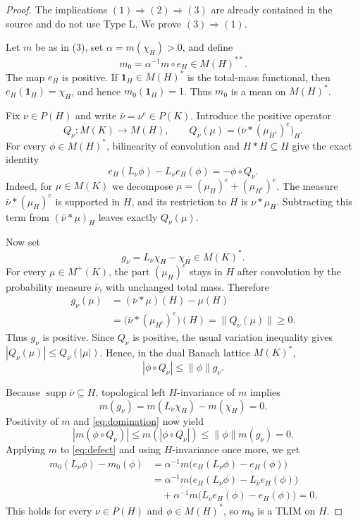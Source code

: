 \documentclass[11pt]{article}
\newcommand{\supp}{\operatorname{supp}}
\begin{document}
\begin{proof}
The implications $(1)\Rightarrow(2)\Rightarrow(3)$ are already contained in
the source and do not use Type L.  We prove $(3)\Rightarrow(1)$.

Let $m$ be as in (3), set $\alpha=m(\chi_H)>0$, and define
\[
  m_0=\alpha^{-1}m\circ e_H\in M(H)^{**}.
\]
The map $e_H$ is positive.  If $\mathbf 1_H\in M(H)^*$ is the total-mass
functional, then $e_H(\mathbf 1_H)=\chi_H$, and hence
$m_0(\mathbf 1_H)=1$.  Thus $m_0$ is a mean on $M(H)^*$.

Fix $\nu\in P(H)$ and write $\bar\nu=\nu^e\in P(K)$.  Introduce the positive
operator
\[
 Q_\nu:M(K)\longrightarrow M(H),\qquad
 Q_\nu(\mu)=\bigl(\bar\nu*(\mu_{H^c})^e\bigr)_H.
\]
For every $\phi\in M(H)^*$, bilinearity of convolution and
$H*H\subseteq H$ give the exact identity
\begin{equation}\label{eq:defect}
 e_H(L_\nu\phi)-L_{\bar\nu}e_H(\phi)=-\phi\circ Q_\nu.
\end{equation}
Indeed, for $\mu\in M(K)$ we decompose
$\mu=(\mu_H)^e+(\mu_{H^c})^e$.  The measure
$\bar\nu*(\mu_H)^e$ is supported in $H$, and its restriction to $H$ is
$\nu*\mu_H$.  Subtracting this term from
$(\bar\nu*\mu)_H$ leaves exactly $Q_\nu(\mu)$.

Now set
\[
 g_\nu=L_{\bar\nu}\chi_H-\chi_H\in M(K)^*.
\]
For every $\mu\in M^+(K)$, the part $(\mu_H)^e$ stays in $H$ after
convolution by the probability measure $\bar\nu$, with unchanged total mass.
Therefore
\begin{align}\label{eq:incoming}
 g_\nu(\mu)
 &= (\bar\nu*\mu)(H)-\mu(H)\\
 &= \bigl(\bar\nu*(\mu_{H^c})^e\bigr)(H)
  = \|Q_\nu(\mu)\|\geq0.
\end{align}
Thus $g_\nu$ is positive.  Since $Q_\nu$ is positive, the usual variation
inequality gives $|Q_\nu(\mu)|\leq Q_\nu(|\mu|)$.  Hence, in the dual Banach
lattice $M(K)^*$,
\begin{equation}\label{eq:domination}
  |\phi\circ Q_\nu|\leq \|\phi\|g_\nu.
\end{equation}

Because $\supp\bar\nu\subseteq H$, topological left $H$-invariance of $m$
implies
\[
 m(g_\nu)=m(L_{\bar\nu}\chi_H)-m(\chi_H)=0.
\]
Positivity of $m$ and \eqref{eq:domination} now yield
\[
 |m(\phi\circ Q_\nu)|
 \leq m(|\phi\circ Q_\nu|)
 \leq \|\phi\|m(g_\nu)=0.
\]
Applying $m$ to \eqref{eq:defect} and using $H$-invariance once more, we get
\begin{align*}
 m_0(L_\nu\phi)-m_0(\phi)
 &=\alpha^{-1}m\bigl(e_H(L_\nu\phi)-e_H(\phi)\bigr)\\
 &=\alpha^{-1}m\bigl(e_H(L_\nu\phi)-L_{\bar\nu}e_H(\phi)\bigr)\\
 &\quad+\alpha^{-1}m\bigl(L_{\bar\nu}e_H(\phi)-e_H(\phi)\bigr)=0.
\end{align*}
This holds for every $\nu\in P(H)$ and $\phi\in M(H)^*$, so $m_0$ is a TLIM
on $H$.
\end{proof}
\end{document}
